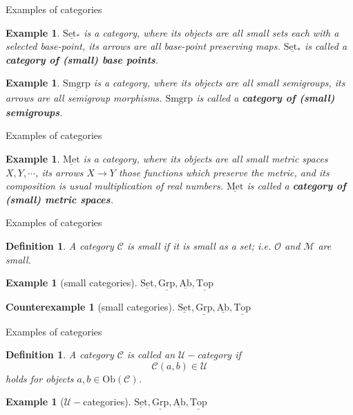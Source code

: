 \documentclass[dvipdfmx,10pt,notheorems]{beamer}
\newtheorem{counterexample}[theorem]{Counterexample}
\newtheorem{definition}[theorem]{Definition}
\newtheorem{example}[theorem]{Example}
\renewcommand{\#}{^\sharp}
\begin{document}
	
	
		\begin{frame}{Examples of categories}
			\begin{example}
			$\underline{\mathrm{Set}_*}$ is a category, where its objects are all small sets each with a selected base-point,
			its arrows are all base-point preserving maps.
			$\underline{\mathrm{Set}_*}$ is called a {\bf category of (small) base points}.
			\end{example}
			\begin{example}
			$\underline{\mathrm{Smgrp}}$ is a category, where its objects are all small semigroups,
			its arrows are all semigroup morphisms.
			$\underline{\mathrm{Smgrp}}$ is called a {\bf category of (small) semigroups}.
			\end{example}
	\end{frame}



	\begin{frame}{Examples of categories}
			\begin{example}
			$\underline{\mathrm{Met}}$ is a category, where its objects are all small metric spaces $X,Y,\cdots$,
			its arrows $X\rightarrow Y$ those functions which preserve the metric,
			and its composition is usual multiplication of real numbers.
			$\underline{\mathrm{Met}}$ is called a {\bf category of (small) metric spaces}.
			\end{example}
	\end{frame}

	
	
	
	\begin{frame}{Examples of categories}
			\begin{definition}
					A category $\mathcal{C}$ is small if it is small as a set; i.e. $\mathcal{O}$ and $\mathcal{M}$ are small.
			\end{definition}
			\begin{example}[small categories]
					$\underline{\mathrm{Set}},\underline{\mathrm{Grp}},\underline{\mathrm{Ab}},\underline{\mathrm{Top}}$
			\end{example}
			\begin{counterexample}[small categories]
					$\underline{\mathrm{Set}},\underline{\mathrm{Grp}},\underline{\mathrm{Ab}},\underline{\mathrm{Top}}$
			\end{counterexample}
	\end{frame}



	\begin{frame}{Examples of categories}
			\begin{definition}
					A category $\mathcal{C}$ is called an $\mathcal{U}-$category if
							$$
									\mathcal{C}(a,b)\in\mathcal{U}
							$$
					holds for objects $a,b\in\mathrm{Ob}(\mathcal{C})$.
			\end{definition}
			\begin{example}[$\mathcal{U}-$categories]
					$\underline{\mathrm{Set}},\underline{\mathrm{Grp}},\underline{\mathrm{Ab}},\underline{\mathrm{Top}}$
			\end{example}
	\end{frame}
\end{document}
